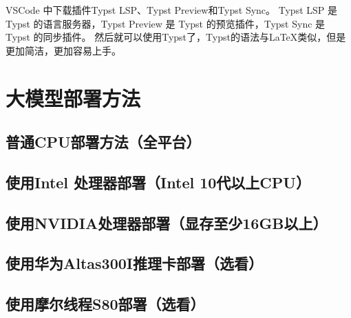\documentclass[lang=cn,a4paper,newtx]{elegantpaper}
\begin{document}
VSCode 中下载插件Typst LSP、Typst Preview和Typst Sync。
Typst LSP 是 Typst 的语言服务器，Typst Preview 是 Typst 的预览插件，Typst Sync 是 Typst 的同步插件。
然后就可以使用Typst了，Typst的语法与LaTeX类似，但是更加简洁，更加容易上手。

\section{大模型部署方法}
\subsection{普通CPU部署方法（全平台）}
\subsection{使用Intel 处理器部署（Intel 10代以上CPU）}
\subsection{使用NVIDIA处理器部署（显存至少16GB以上）}
\subsection{使用华为Altas300I推理卡部署（选看）}
\subsection{使用摩尔线程S80部署（选看）}

\nocite{*}

\end{document}
